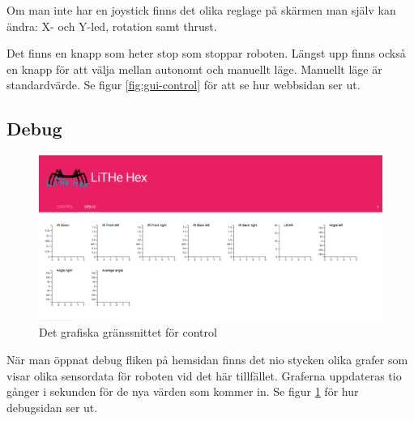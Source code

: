 \documentclass[a4paper,titlepage,12pt]{article}
\begin{document}
    Om man inte har en joystick finns det olika reglage på skärmen man själv kan
    ändra: X- och Y-led, rotation samt thrust.
	
	Det finns en knapp som heter stop som stoppar roboten. Längst upp finns
    också en knapp för att välja mellan autonomt och manuellt läge. Manuellt
    läge är standardvärde. Se figur \ref{fig:gui-control} för att se hur webbsidan
    ser ut.
	
    \newpage
	\subsection{Debug}\label{gui:debug}
	\begin{figure}[h]
		\centering
		\includegraphics[width=0.5\linewidth]{images/gui-debug.png}
		\caption{Det grafiska gränssnittet för control\label{fig:gui-debug}}
	\end{figure}
	När man öppnat debug fliken på hemsidan finns det nio stycken olika grafer som visar 
    olika sensordata för roboten vid det här tillfället. Graferna uppdateras tio
    gånger i sekunden för de nya värden som kommer in. Se figur
    \ref{fig:gui-debug} för hur debugsidan ser ut.
	
\end{document}
